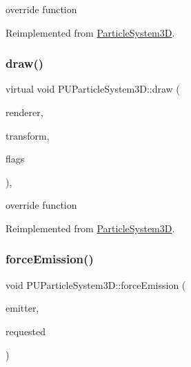 override function 

Reimplemented from \hyperlink{classParticleSystem3D_a78e6969723062a91ffbd46b08dd0fcb2}{Particle\+System3D}.

\mbox{\label{classPUParticleSystem3D_a46c2d79b09fcac96e81be307f9148fea}} 
\subsubsection{\texorpdfstring{draw()}{draw()}\hspace{0.1cm}{\footnotesize\ttfamily [2/2]}}
{\footnotesize\ttfamily virtual void P\+U\+Particle\+System3\+D\+::draw (\begin{DoxyParamCaption}\item[{\hyperlink{classRenderer}{Renderer} $\ast$}]{renderer,  }\item[{const \hyperlink{classMat4}{Mat4} \&}]{transform,  }\item[{uint32\+\_\+t}]{flags }\end{DoxyParamCaption})\hspace{0.3cm}{\ttfamily [override]}, {\ttfamily [virtual]}}

override function 

Reimplemented from \hyperlink{classParticleSystem3D_a78e6969723062a91ffbd46b08dd0fcb2}{Particle\+System3D}.

\mbox{\label{classPUParticleSystem3D_abc2757bc7cd26511bdce5d0dd85f0d8a}} 
\subsubsection{\texorpdfstring{force\+Emission()}{forceEmission()}\hspace{0.1cm}{\footnotesize\ttfamily [1/2]}}
{\footnotesize\ttfamily void P\+U\+Particle\+System3\+D\+::force\+Emission (\begin{DoxyParamCaption}\item[{\hyperlink{classPUEmitter}{P\+U\+Emitter} $\ast$}]{emitter,  }\item[{unsigned}]{requested }\end{DoxyParamCaption})}

